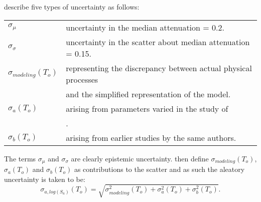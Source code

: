 \cite{dr_Somerville01a} describe five types of uncertainty as
follows:

\begin{supertabular}{ll}
$\sigma_{\mu}$ & uncertainty in the median attenuation = 0.2. \\
$\sigma_{\sigma}$ & uncertainty in the scatter about median attenuation = 0.15. \\
$\sigma_{modeling}(T_o)$ & representing the discrepancy between
actual
physical processes \\
  & and the simplified representation of the model.\\
$\sigma_a(T_o)$ & arising from parameters varied in the study of \\
 & \cite{dr_Somerville01a}. \\
$\sigma_b(T_o)$ & arising from earlier studies by the same
authors.\\
\end{supertabular}

The terms $\sigma_{\mu}$ and $\sigma_{\sigma}$ are clearly
epistemic uncertainty. \cite{dr_Somerville01a} then define
$\sigma_{modeling}(T_o)$, $\sigma_a(T_o)$ and $\sigma_b(T_o)$ as
contributions to the scatter and as such the aleatory uncertainty
is taken to be:
\begin{equation}
\sigma_{a,log(S_a)}(T_o) = \sqrt{
\sigma_{modeling}^2(T_o)+\sigma_a^2(T_o)+\sigma_b^2(T_o) }.
\end{equation}

\
\eject






